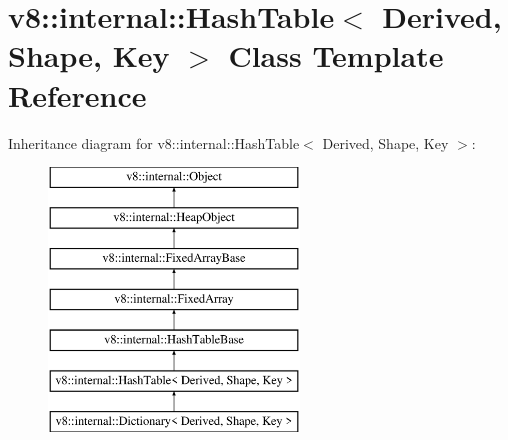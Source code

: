 \hypertarget{classv8_1_1internal_1_1_hash_table}{}\section{v8\+:\+:internal\+:\+:Hash\+Table$<$ Derived, Shape, Key $>$ Class Template Reference}
\label{classv8_1_1internal_1_1_hash_table}
Inheritance diagram for v8\+:\+:internal\+:\+:Hash\+Table$<$ Derived, Shape, Key $>$\+:\begin{figure}[H]
\begin{center}
\leavevmode
\includegraphics[height=7.000000cm]{classv8_1_1internal_1_1_hash_table}
\end{center}
\end{figure}
